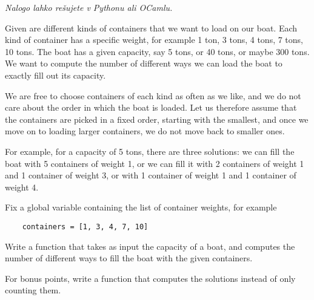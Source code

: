 \documentclass[arhiv]{../izpit}
\begin{document}
\prostor

\naloga[]
\emph{Nalogo lahko rešujete v Pythonu ali OCamlu.}

\vspace{5mm} Given are different kinds of containers that we want to load on
our boat.
%
Each kind of container has a specific weight, for example 1 ton, 3 tons, 4 tons, 7 tons, 10 tons.
%
The boat has a given capacity, say 5 tons, or 40 tons, or maybe 300 tons.
%
We want to compute the number of different ways we can load the boat to exactly fill out its capacity.

We are free to choose containers of each kind as often as we like, and we do not care about the order in which the boat is loaded.
%
Let us therefore assume that the containers are picked in a fixed order, starting with the smallest, and once we move on to loading larger containers, we do not move back to smaller ones.

For example, for a capacity of 5 tons, there are three solutions: we can fill the boat with 5 containers of weight 1, or we can fill it with 2 containers of weight 1 and 1 container of weight 3, or with 1 container of weight 1 and 1 container of weight 4.

Fix a global variable containing the list of container weights, for example
\begin{verbatim}
    containers = [1, 3, 4, 7, 10]
\end{verbatim}

%
Write a function that takes as input the capacity of a boat, and computes the number of different ways to fill the boat with the given containers.

For bonus points, write a function that computes the solutions instead of only counting them.
\end{document}
